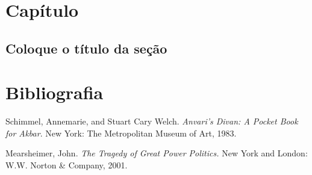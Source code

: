 \documentclass[a4paper]{book}
\begin{document}
\lipsum[1-5] %


\chapter{Capítulo}
\section{Coloque o título da seção}
\lipsum[1-5]

\chapter*{Bibliografia}


\setlength{\parindent}{0pt}

Schimmel, Annemarie, and Stuart Cary Welch. \textit{Anvari's Divan: A Pocket Book for Akbar}.  New York: The Metropolitan Museum of Art, 1983.

\setlength{\parskip}{10pt} %

Mearsheimer, John. \textit{The Tragedy of Great Power Politics.} New York and London: W.W. Norton \& Company, 2001.
\end{document}
